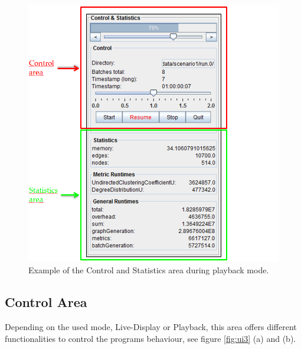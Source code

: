 \begin{figure} [h]
\centering
\includegraphics [scale=0.8] {images/ui2}
\caption{Example of the Control and Statistics area during playback mode.}
\label{fig:ui2}
\end{figure}

\subsection{Control Area}
Depending on the used mode, Live-Display or Playback, this area offers different functionalities to control the programs behaviour, see figure \ref{fig:ui3} (a) and (b).

